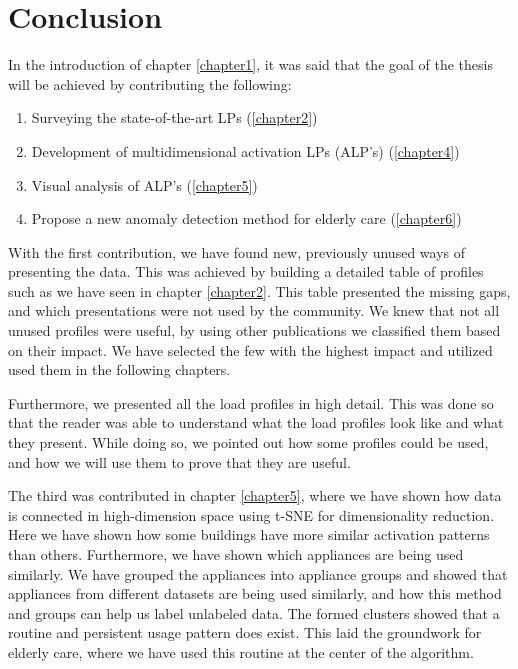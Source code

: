 
\chapter{Conclusion} %
\label{chapter7} %

In the introduction of chapter \ref{chapter1}, it was said that the goal of the thesis will be achieved by contributing the following:


\begin{enumerate}
	\item Surveying the state-of-the-art LPs (\ref{chapter2})
	\item Development of multidimensional activation LPs (ALP's) (\ref{chapter4})
	\item Visual analysis of ALP's (\ref{chapter5})
	\item Propose a new anomaly detection method for elderly care (\ref{chapter6})
\end{enumerate}


With the first contribution, we have found new, previously unused ways of presenting the data.
This was achieved by building a detailed table of profiles such as we have seen in chapter \ref{chapter2}.
This table presented the missing gaps, and which presentations were not used by the community.
We knew that not all unused profiles were useful, by using other publications we classified them based on their impact. 
We have selected the few with the highest impact and utilized used them in the following chapters.

Furthermore, we presented all the load profiles in high detail. This was done so that the reader was able to understand what the load profiles look like and what they present.
While doing so, we pointed out how some profiles could be used, and how we will use them to prove that they are useful. 

The third was contributed in chapter \ref{chapter5}, where we have shown how data is connected in high-dimension space
using t-SNE for dimensionality reduction. Here we have shown how some buildings have more similar activation patterns than others.
Furthermore, we have shown which appliances are being used similarly. 
We have grouped the appliances into appliance groups and showed that appliances from different datasets are being used similarly, and how this method and groups can help us label unlabeled data. 
The formed clusters showed that a routine and persistent usage pattern does exist. This laid the groundwork for elderly care, where we have used this routine at the center of the algorithm.

